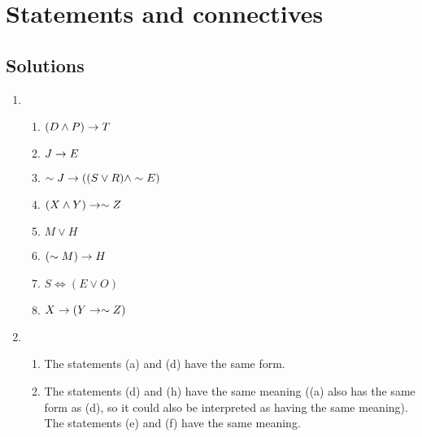 \section{Statements and connectives}

\subsection*{Solutions}
\begin{enumerate}
  \item %
    \begin{enumerate}[(\alph*)]
      \item \((D \wedge P) \rightarrow T\)
      \item \(J \rightarrow E\)
      \item \(\sim J \rightarrow ((S \vee R) \wedge \sim E)\)
      \item \((X \wedge Y) \rightarrow \sim Z\)
      \item \(M \vee H\)
      \item \((\sim M) \rightarrow H\)
      \item \(S \iff (E \vee O)\)
      \item \(X \rightarrow (Y \rightarrow \sim Z)\)
    \end{enumerate}

  \item %
    \begin{enumerate}[(\alph*)]
      \item The statements (a) and (d) have the same form.
      \item The statements (d) and (h) have the same meaning ((a) also has the same form as (d), so it could also be interpreted as having the same meaning). The statements (e) and (f) have the same meaning.
    \end{enumerate}
\end{enumerate}
